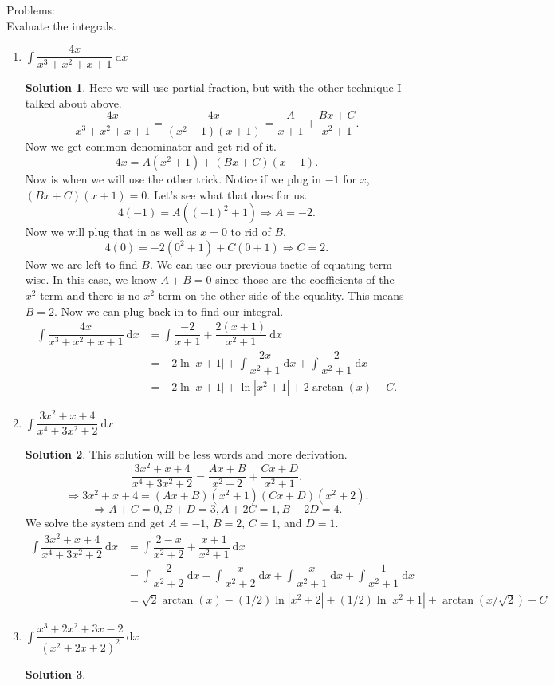 \documentclass[10pt]{article}
\newcommand{\dx}{\:\mathrm{d}x}
\theoremstyle{Theorem}
\theoremstyle{definition}
\newtheorem*{solution}{Solution}
\theoremstyle{remark}
\theoremstyle{custom}
\begin{document}
\noindent Problems:\\
Evaluate the integrals.
\begin{enumerate}[1.]
\item $\int \dfrac{4x}{x^3+x^2+x+1}\dx$
\begin{solution}
Here we will use partial fraction, but with the other technique I talked about above.
\[
\dfrac{4x}{x^3+x^2+x+1}=\dfrac{4x}{(x^2+1)(x+1)}=\dfrac{A}{x+1}+\dfrac{Bx+C}{x^2+1}.
\]
Now we get common denominator and get rid of it.
\[
4x=A(x^2+1)+(Bx+C)(x+1).
\]
Now is when we will use the other trick. Notice if we plug in $-1$ for $x$, $(Bx+C)(x+1)=0$. Let's see what that does for us.
\[
4(-1)=A((-1)^2+1) \Rightarrow A=-2.
\]
Now we will plug that in as well as $x=0$ to rid of $B$.
\[
4(0)=-2(0^2+1)+C(0+1) \Rightarrow C=2.
\]
Now we are left to find $B$. We can use our previous tactic of equating term-wise. In this case, we know $A+B=0$ since those are the coefficients of the $x^2$ term and there is no $x^2$ term on the other side of the equality. This means $B=2$. Now we can plug back in to find our integral.
\begin{align*}
\int \dfrac{4x}{x^3+x^2+x+1}\dx
&=\int \dfrac{-2}{x+1}+\dfrac{2(x+1)}{x^2+1}\dx \\[2pt]
&=-2\ln|x+1|+\int \dfrac{2x}{x^2+1}\dx+ \int \dfrac{2}{x^2+1}\dx\\[2pt]
&=-2\ln|x+1|+\ln|x^2+1|+2\arctan(x)+C.
\end{align*}
\end{solution}
\item $\int \dfrac{3x^2+x+4}{x^4+3x^2+2}\dx$
\begin{solution}
This solution will be less words and more derivation.
\[
\dfrac{3x^2+x+4}{x^4+3x^2+2}=\dfrac{Ax+B}{x^2+2}+\dfrac{Cx+D}{x^2+1}.
\]
\[ 
\Rightarrow 3x^2+x+4=(Ax+B)(x^2+1)(Cx+D)(x^2+2).
\]
\[
\Rightarrow A+C=0, B+D=3, A+2C=1, B+2D=4.
\]
We solve the system and get $A=-1$, $B=2$, $C=1$, and $D=1$. 
\begin{align*}
\int \dfrac{3x^2+x+4}{x^4+3x^2+2}\dx&=\int \dfrac{2-x}{x^2+2}+\dfrac{x+1}{x^2+1}\dx \\[2pt]
&=\int \dfrac{2}{x^2+2}\dx-\int \dfrac{x}{x^2+2}\dx+\int \dfrac{x}{x^2+1}\dx +\int \dfrac{1}{x^2+1}\dx\\[2pt]
&=\sqrt{2}\arctan(x)-(1/2)\ln|x^2+2|+(1/2)\ln|x^2+1|+\arctan(x/\sqrt{2})+C
\end{align*}
\end{solution}
\item $\int \dfrac{x^3+2x^2+3x-2}{(x^2+2x+2)^2}\dx$
\begin{solution}

\end{solution}
\end{enumerate}
\end{document}

